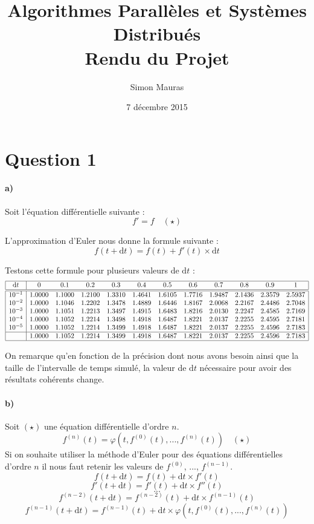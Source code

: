 \documentclass[a4paper]{article}
\title{Algorithmes Parallèles et Systèmes Distribués\\Rendu du Projet}
\author{Simon Mauras}
\date{7 décembre 2015}
\begin{document}
  
  \maketitle
  
  \section*{Question 1}
  
  \paragraph{a)} Soit l'équation différentielle suivante :
  \[f' = f \quad(\star)\]
  
  L'approximation d'Euler nous donne la formule suivante :
  \[f(t + \mathrm dt) = f(t) + f'(t) \times \mathrm dt\]
  
  Testons cette formule pour plusieurs valeurs de $\mathrm dt$ :
  \[\begin{array}{|c|ccccccccccc|}
  \hline
  \mathrm dt & 0 & 0.1 & 0.2 & 0.3 & 0.4 & 0.5 & 0.6 & 0.7 & 0.8 & 0.9 & 1 \\
  \hline\hline
  10^{-1} &
  1.0000 &
  1.1000 &
  1.2100 &
  1.3310 &
  1.4641 &
  1.6105 &
  1.7716 &
  1.9487 &
  2.1436 &
  2.3579 &
  2.5937 \\
  10^{-2} &
  1.0000 &
  1.1046 &
  1.2202 &
  1.3478 &
  1.4889 &
  1.6446 &
  1.8167 &
  2.0068 &
  2.2167 &
  2.4486 &
  2.7048 \\
  10^{-3} &
  1.0000 &
  1.1051 &
  1.2213 &
  1.3497 &
  1.4915 &
  1.6483 &
  1.8216 &
  2.0130 &
  2.2247 &
  2.4585 &
  2.7169 \\
  10^{-4} &
  1.0000 &
  1.1052 &
  1.2214 &
  1.3498 &
  1.4918 &
  1.6487 &
  1.8221 &
  2.0137 &
  2.2255 &
  2.4595 &
  2.7181 \\
  10^{-5} &
  1.0000 &
  1.1052 &
  1.2214 &
  1.3499 &
  1.4918 &
  1.6487 &
  1.8221 &
  2.0137 &
  2.2255 &
  2.4596 &
  2.7183 \\
  \hline
  &
  1.0000 &
  1.1052 &
  1.2214 &
  1.3499 &
  1.4918 &
  1.6487 &
  1.8221 &
  2.0137 &
  2.2255 &
  2.4596 &
  2.7183 \\
  \hline
  \end{array}\]
  
  On remarque qu'en fonction de la précision dont nous avons besoin ainsi que la taille de l'intervalle de temps simulé, la valeur de $\mathrm dt$ nécessaire pour avoir des résultats cohérents change.
  
  \paragraph{b)} Soit $(\star)$ une équation différentielle d'ordre $n$.
  \[f^{(n)}(t) = \varphi(t, f^{(0)}(t), ..., f^{(n)}(t)) \quad (\star)\]
  Si on souhaite utiliser la méthode d'Euler pour des équations différentielles d'ordre $n$ il nous faut retenir les valeurs de $f^{(0)}$, ..., $f^{(n-1)}$.
  \[f(t+\mathrm dt) = f(t) + \mathrm dt \times f'(t)\]
  \[f'(t+\mathrm dt) = f'(t) + \mathrm dt \times f''(t)\]
  \[...\]
  \[f^{(n-2)}(t+\mathrm dt) = f^{(n-2)}(t) + \mathrm dt \times f^{(n-1)}(t)\]
  \[f^{(n-1)}(t+\mathrm dt) = f^{(n-1)}(t) + \mathrm dt \times \varphi(t, f^{(0)}(t), ..., f^{(n)}(t))\]
  
\end{document}
